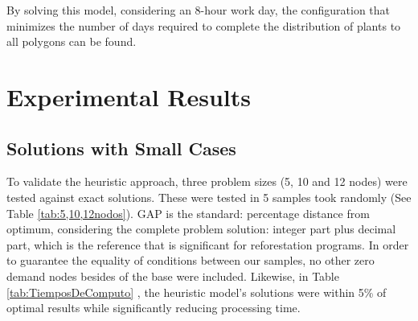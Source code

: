 \documentclass{amsart}
\begin{document}
        
        By solving this model, considering an 8-hour work day, the configuration that minimizes the number of days required to complete the distribution of plants to all polygons can be found.

    \section{Experimental Results}
        \subsection{Solutions with Small Cases}\label{SolutionsWithSmallCases}
        To validate the heuristic approach, three problem sizes (5, 10 and 12 nodes) were tested against exact solutions. These were tested in 5 samples took randomly (See Table \ref{tab:5,10,12nodos}). GAP is the standard: percentage distance from optimum, considering the complete problem solution: integer part plus decimal part, which is the reference that is significant for reforestation programs. In order to guarantee the equality of conditions between our samples, no other zero demand nodes besides of the base were included. Likewise, in Table \ref{tab:TiemposDeComputo} , the heuristic model's solutions were within 5\% of optimal results while significantly reducing processing time.
        
\end{document}

